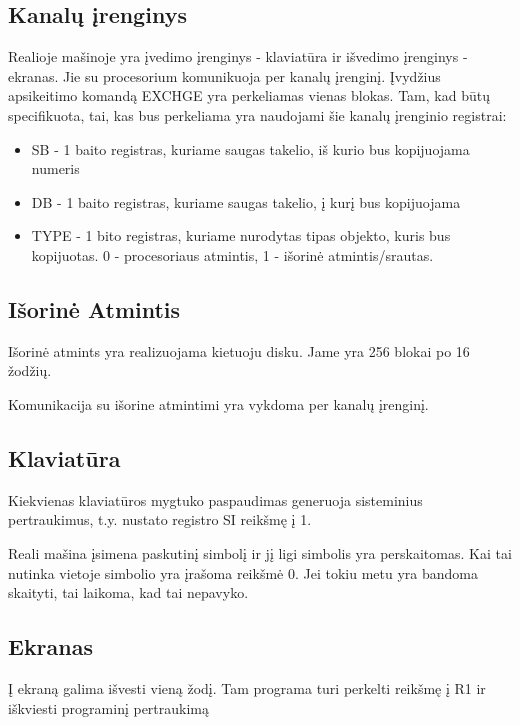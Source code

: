 \documentclass{VUMIFInfKursinis}
\begin{document}
\subsection{Kanalų įrenginys}

Realioje mašinoje yra įvedimo įrenginys - klaviatūra ir išvedimo įrenginys - ekranas. Jie su procesorium komunikuoja per kanalų įrenginį. Įvydžius apsikeitimo komandą EXCHGE yra perkeliamas vienas blokas. Tam, kad būtų specifikuota, tai, kas bus perkeliama yra naudojami šie kanalų įrenginio registrai:

\begin{itemize}
	\item SB - 1 baito registras, kuriame saugas takelio, iš kurio bus kopijuojama numeris
	\item DB - 1 baito registras, kuriame saugas takelio, į kurį bus kopijuojama
	\item TYPE - 1 bito registras, kuriame nurodytas tipas objekto, kuris bus kopijuotas. 0 - procesoriaus atmintis, 1 - išorinė atmintis/srautas.
\end{itemize}

\subsection{Išorinė Atmintis}

Išorinė atmints yra realizuojama kietuoju disku. Jame yra 256 blokai po 16 žodžių.

Komunikacija su išorine atmintimi yra vykdoma per kanalų įrenginį.

\subsection{Klaviatūra}

Kiekvienas klaviatūros mygtuko paspaudimas generuoja sisteminius pertraukimus, t.y. nustato registro SI reikšmę į 1. 

Reali mašina įsimena paskutinį simbolį ir jį ligi simbolis yra perskaitomas. Kai tai nutinka vietoje simbolio yra įrašoma reikšmė 0. Jei tokiu metu yra bandoma skaityti, tai laikoma, kad tai nepavyko.

\subsection{Ekranas}

Į ekraną galima išvesti vieną žodį. Tam programa turi perkelti reikšmę į R1 ir iškviesti programinį pertraukimą
\end{document}
